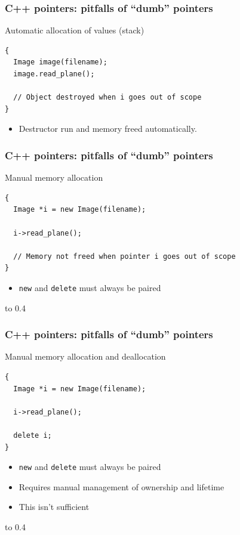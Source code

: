 \documentclass[handout]{beamer}
\begin{document}
\begin{frame}[fragile]
  \frametitle{C++ pointers: pitfalls of “dumb” pointers}
\begin{block}{Automatic allocation of values (stack)}
  \begin{lstlisting}
{
  Image image(filename);
  image.read_plane();

  // Object destroyed when i goes out of scope
}
\end{lstlisting}
\pause
  \begin{itemize}
    \pause
  \item Destructor run and memory freed automatically.
  \end{itemize}
\end{block}
\end{frame}

\begin{frame}[fragile]
  \frametitle{C++ pointers: pitfalls of “dumb” pointers}
\begin{block}{Manual memory allocation}
  \begin{lstlisting}
{
  Image *i = new Image(filename);

  i->read_plane();

  // Memory not freed when pointer i goes out of scope
}
\end{lstlisting}
  \begin{itemize}
    \pause
  \item \texttt{new} and \texttt{delete} must always be paired
  \end{itemize}
\end{block}
\vbox to 0.4\textheight{%
}%
\end{frame}

\begin{frame}[fragile]
  \frametitle{C++ pointers: pitfalls of “dumb” pointers}
\begin{block}{Manual memory allocation and deallocation}
  \begin{lstlisting}
{
  Image *i = new Image(filename);

  i->read_plane();

  delete i;
}
\end{lstlisting}
  \begin{itemize}
  \item \texttt{new} and \texttt{delete} must always be paired
  \item Requires manual management of ownership and lifetime
    \pause
  \item This isn't sufficient
  \end{itemize}
\end{block}
\vbox to 0.4\textheight{%
}%
\end{frame}
\end{document}
